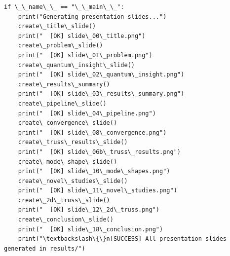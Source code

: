\documentclass[12pt, a4paper]{article}
\begin{document}
\begin{lstlisting}[style=codestyle, caption={{generate_presentation.py --- Slide Generator}}]
if \_\_name\_\_ == "\_\_main\_\_":
    print("Generating presentation slides...")
    create\_title\_slide()
    print("  [OK] slide\_00\_title.png")
    create\_problem\_slide()
    print("  [OK] slide\_01\_problem.png")
    create\_quantum\_insight\_slide()
    print("  [OK] slide\_02\_quantum\_insight.png")
    create\_results\_summary()
    print("  [OK] slide\_03\_results\_summary.png")
    create\_pipeline\_slide()
    print("  [OK] slide\_04\_pipeline.png")
    create\_convergence\_slide()
    print("  [OK] slide\_08\_convergence.png")
    create\_truss\_results\_slide()
    print("  [OK] slide\_06b\_truss\_results.png")
    create\_mode\_shape\_slide()
    print("  [OK] slide\_10\_mode\_shapes.png")
    create\_novel\_studies\_slide()
    print("  [OK] slide\_11\_novel\_studies.png")
    create\_2d\_truss\_slide()
    print("  [OK] slide\_12\_2d\_truss.png")
    create\_conclusion\_slide()
    print("  [OK] slide\_18\_conclusion.png")
    print("\textbackslash\{\}n[SUCCESS] All presentation slides generated in results/")
\end{lstlisting}

\end{document}
